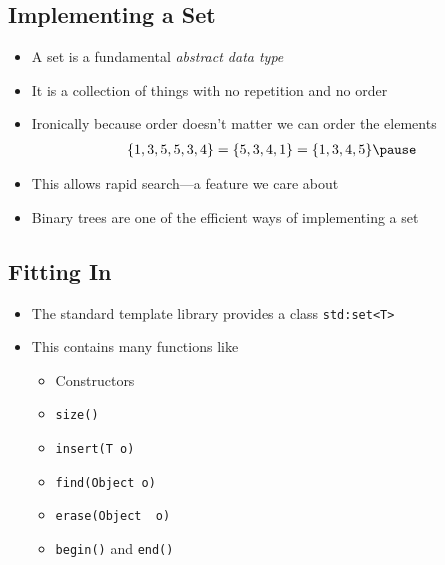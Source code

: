 
\begin{slide}
\section{Implementing a Set}

\begin{PauseHighLight}
  \begin{itemize}
  \item A set is a fundamental \emph{abstract data type}\pause
  \item It is a collection of things with no repetition and no
    order\pause
  \item Ironically because order doesn't matter we can order the
    elements
    \begin{align*}
      \{1,3,5,5,3,4\} = \{5, 3, 4, 1\} = \{1, 3, 4, 5\}\pause 
    \end{align*}
  \item This allows rapid search---a feature we care about\pause
  \item Binary trees are one of the efficient ways of implementing a set\pause
  \end{itemize}
\end{PauseHighLight}
\end{slide}



\begin{slide}
  \section[-1]{Fitting In}

  \begin{PauseHighLight}
    \begin{itemize}
    \item The standard template library provides a class \texttt{std:set<T>}\pause
    \item This contains many functions like
      \begin{itemize}
      \item Constructors
      \item \texttt{size()}
      \item \texttt{insert(T\,o)}
      \item \texttt{find(Object\,o)}
      \item \texttt{erase(Object\, o)}
      \item \texttt{begin()} and \texttt{end()}
      \end{itemize}\pause
    \end{itemize}
  \end{PauseHighLight}
\end{slide}

